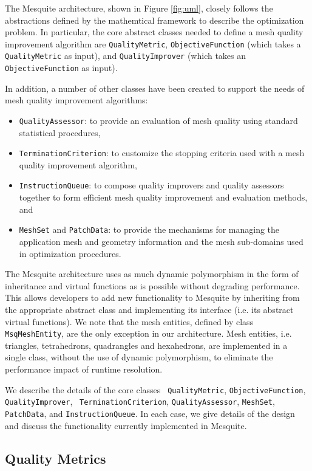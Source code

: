 \documentclass[psfig]{article}
\begin{document}
The Mesquite architecture, shown in Figure \ref{fig:uml}, closely
follows the abstractions defined by the mathemtical framework 
to describe the optimization problem.
In particular, the core abstract classes needed to
define a mesh quality improvement algorithm are {\tt QualityMetric},
{\tt ObjectiveFunction} (which takes a {\tt QualityMetric} as
input), and {\tt QualityImprover} (which takes an {\tt ObjectiveFunction}
as input).

In addition, a number of other classes have been created to support
the needs of mesh quality improvement algorithms:
\begin{itemize}
\item {\tt QualityAssessor}: to provide an evaluation of mesh
quality using standard statistical procedures,
\item {\tt TerminationCriterion}: to customize the stopping criteria
used with a mesh quality improvement algorithm,
\item {\tt InstructionQueue}: to compose quality improvers and
quality assessors together to form efficient mesh quality improvement
and evaluation methods, and
\item {\tt MeshSet} and {\tt PatchData}: to provide the mechanisms
for managing the application mesh and geometry information and the
mesh sub-domains used in optimization procedures.
\end{itemize}

The Mesquite architecture uses as much dynamic polymorphism in the
form of inheritance and virtual functions as is possible without
degrading performance.  This allows developers to add new
functionality to Mesquite by inheriting from the appropriate abstract
class and implementing its interface (i.e. its abstract virtual
functions).  We note that the mesh entities, defined by class {\tt
MsqMeshEntity}, are the only exception in our architecture.  Mesh
entities, i.e. triangles, tetrahedrons, quadrangles and hexahedrons,
are implemented in a single class, without the use of dynamic
polymorphism, to eliminate the performance impact of runtime
resolution.

We describe the details of the core classes {\tt
QualityMetric}, {\tt ObjectiveFunction}, {\tt QualityImprover}, {\tt
TerminationCriterion}, {\tt QualityAssessor}, {\tt MeshSet}, {\tt
PatchData}, and {\tt InstructionQueue}.
In each case, we give details
of the design and discuss the functionality currently implemented in
Mesquite.

\subsection{Quality Metrics} \label{sec:QM}
\end{document}
